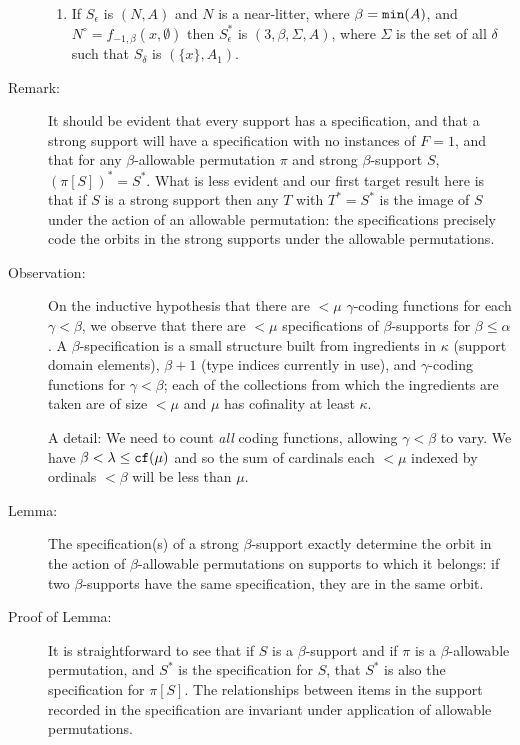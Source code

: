 \documentclass[112pt]{article}
\begin{document}
\begin{description}
\begin{enumerate}
\item  If $S_\epsilon$ is $(N,A)$ and $N$ is a near-litter, where $\beta={\tt min}(A)$, and $N^\circ=f_{-1,\beta}(x,\emptyset)$  then $S^*_\epsilon$ is $(3,\beta,\Sigma,A)$, where  $\Sigma$ is the set of all $\delta$ such that $S_\delta$ is $(\{x\},A_1)$.

\end{enumerate}



\item[Remark:]  It should be evident that every support has a specification, and that a strong support will have a specification with no instances of $F = 1$, and that for any $\beta$-allowable permutation $\pi$ and strong $\beta$-support $S$,
$(\pi[S])^* = S^*$.  What is less evident and our first target result here is that if $S$ is a strong support then any $T$ with $T^* = S^*$ is the image of $S$ under the action of an allowable permutation:  the specifications precisely code the orbits in the strong supports under the allowable permutations.

\item[Observation:]  On the inductive hypothesis that there are $<\mu$ $\gamma$-coding functions for each $\gamma<\beta$, we observe that there are $<\mu$ specifications of $\beta$-supports for $\beta\leq \alpha$.   A $\beta$-specification is a small structure built from ingredients in $\kappa$ (support domain elements), $\beta+1$ (type indices currently in use), and
$\gamma$-coding functions for $\gamma<\beta$;  each of the collections from which the ingredients are taken are of size $<\mu$ and $\mu$ has cofinality at least $\kappa$.

A detail:  We need to count {\em all\/} coding functions, allowing $\gamma<\beta$ to vary.   We have $\beta < \lambda \leq {\tt cf}(\mu)$ and so the sum of cardinals each $<\mu$ indexed by ordinals $<\beta$ will be less than $\mu$.

\item[Lemma:]  The specification(s) of a strong $\beta$-support exactly determine the orbit in the action of $\beta$-allowable permutations on supports to which it belongs:  if two $\beta$-supports have the same specification, they are in the same orbit.

\item[Proof of Lemma:]

It is straightforward to see that if $S$ is a $\beta$-support and if $\pi$ is a $\beta$-allowable permutation, and $S^*$ is the  specification for $S$, that $S^*$ is also the specification for $\pi[S]$.  The relationships between items in the support recorded in the specification are invariant under application of allowable permutations.


\end{description}
\end{document}
